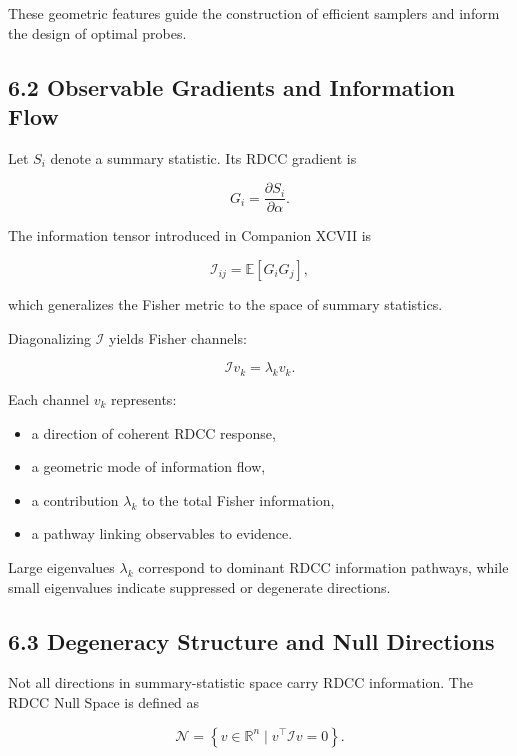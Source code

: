 \documentclass[11pt,a4paper]{article}
\begin{document}
These geometric features guide the construction of efficient samplers and 
inform the design of optimal probes.

\subsection*{6.2 Observable Gradients and Information Flow}

Let $S_{i}$ denote a summary statistic. Its RDCC gradient is


\[
    G_{i}
    =
    \frac{\partial S_{i}}{\partial \alpha}.
\]


The information tensor introduced in Companion XCVII is


\[
    \mathcal{I}_{ij}
    =
    \mathbb{E}
    \left[
        G_{i} G_{j}
    \right],
\]


which generalizes the Fisher metric to the space of summary statistics.

Diagonalizing $\mathcal{I}$ yields Fisher channels:


\[
    \mathcal{I} v_{k} = \lambda_{k} v_{k}.
\]



Each channel $v_{k}$ represents:

\begin{itemize}
    \item a direction of coherent RDCC response,
    \item a geometric mode of information flow,
    \item a contribution $\lambda_{k}$ to the total Fisher information,
    \item a pathway linking observables to evidence.
\end{itemize}

Large eigenvalues $\lambda_{k}$ correspond to dominant RDCC information 
pathways, while small eigenvalues indicate suppressed or degenerate directions.

\subsection*{6.3 Degeneracy Structure and Null Directions}

Not all directions in summary-statistic space carry RDCC information. The RDCC 
Null Space is defined as


\[
    \mathcal{N}
    =
    \left\{
        v \in \mathbb{R}^{n}
        \; \bigg| \;
        v^{\top} \mathcal{I} v = 0
    \right\}.
\]
\end{document}
